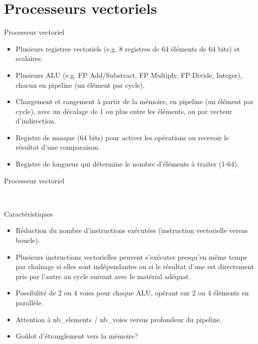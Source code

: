 \documentclass[10pt]{beamer}
\begin{document}
\section{Processeurs vectoriels}

\begin{frame}{Processeur vectoriel}

  \begin{itemize}
    \item Plusieurs registres vectoriels (e.g. 8 registres de 64 éléments de 64 bits) et scalaires.

    \item Plusieurs ALU (e.g. FP Add/Substract, FP Multiply, FP Divide, Integer), chacun en pipeline (un élément par cycle).

    \item Chargement et rangement à partir de la mémoire, en pipeline (un élément par cycle), avec un décalage de 1 ou plus entre les éléments, ou par vecteur d'indirection.

    \item Registre de masque (64 bits) pour activer les opérations ou recevoir le résultat d'une comparaison.

    \item Registre de longueur qui détermine le nombre d'éléments à traiter (1-64).
  \end{itemize}
\end{frame}

\begin{frame}[fragile]{Processeur vectoriel}

  \begin{center} %
     \\
  \end{center}

\end{frame}

\begin{frame}[fragile]{Caractéristiques}

  \begin{itemize}
    \item Réduction du nombre d'instructions exécutées (instruction vectorielle versus boucle).

    \item Plusieurs instructions vectorielles peuvent s'exécuter presqu'en même temps par chaînage si elles sont indépendantes ou si le résultat d'une est directement pris par l'autre au cycle suivant avec le matérial adéquat.

    \item Possibilité de 2 ou 4 voies pour chaque ALU, opérant sur 2 ou 4 éléments en parallèle.

    \item Attention à nb\_elements / nb\_voies versus profondeur du pipeline.

    \item Goûlot d'étranglement vers la mémoire?
  \end{itemize}
\end{frame}
\end{document}
